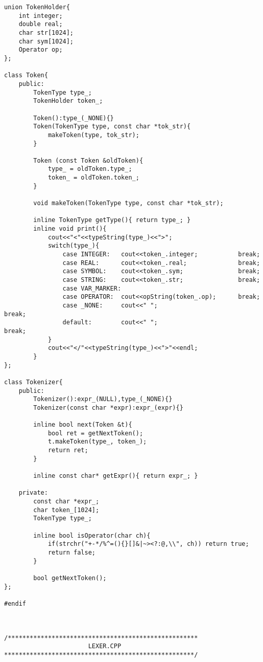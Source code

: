 \documentclass[pdftex,12pt,letterpaper,notitlepage,twoside]{article}
\begin{document}
\begin{lstlisting}[frame=single,caption={C program for testing}]
union TokenHolder{
    int integer;
    double real;
    char str[1024];
    char sym[1024];
    Operator op;
};

class Token{
    public:
        TokenType type_;
        TokenHolder token_;

        Token():type_(_NONE){}
        Token(TokenType type, const char *tok_str){
            makeToken(type, tok_str);
        }

        Token (const Token &oldToken){
            type_ = oldToken.type_;
            token_ = oldToken.token_;
        }

        void makeToken(TokenType type, const char *tok_str);

        inline TokenType getType(){ return type_; }
        inline void print(){
            cout<<"<"<<typeString(type_)<<">";
            switch(type_){
                case INTEGER:   cout<<token_.integer;           break;
                case REAL:      cout<<token_.real;              break;
                case SYMBOL:    cout<<token_.sym;               break;
                case STRING:    cout<<token_.str;               break;
                case VAR_MARKER:
                case OPERATOR:  cout<<opString(token_.op);      break;
                case _NONE:     cout<<" ";                           break;
                default:        cout<<" ";                           break;
            }
            cout<<"</"<<typeString(type_)<<">"<<endl;
        }
};

class Tokenizer{
    public:
        Tokenizer():expr_(NULL),type_(_NONE){}
        Tokenizer(const char *expr):expr_(expr){}

        inline bool next(Token &t){
            bool ret = getNextToken();
            t.makeToken(type_, token_);
            return ret;
        }

        inline const char* getExpr(){ return expr_; }

    private:
        const char *expr_;
        char token_[1024];
        TokenType type_;

        inline bool isOperator(char ch){
            if(strchr("+-*/%^=(){}[]&|~><?:@,\\", ch)) return true;
            return false;
        }

        bool getNextToken();
};

#endif



/****************************************************
                       LEXER.CPP
****************************************************/


\end{lstlisting}
\end{document}
